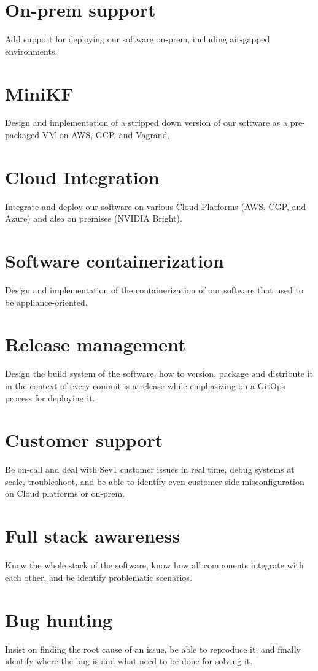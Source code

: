 \documentclass[margin,centered]{res}
\begin{document}
\begin{resume}
\section{\sc On-prem support}
Add support for deploying our software on-prem, including air-gapped
environments.

\section{\sc MiniKF}
Design and implementation of a stripped down version of our software as a
pre-packaged VM on AWS, GCP, and Vagrand.

\section{\sc Cloud Integration}
Integrate and deploy our software on various Cloud Platforms (AWS, CGP, and
Azure) and also on premises (NVIDIA Bright).

\section{\sc Software containerization}
Design and implementation of the containerization of our software that used
to be appliance-oriented.

\section{\sc Release management}
Design the build system of the software, how to version, package and distribute
it in the context of every commit is a release while emphasizing on a GitOps
process for deploying it.

\section{\sc Customer support}
Be on-call and deal with Sev1 customer issues in real time, debug systems at
scale, troubleshoot, and be able to identify even customer-side
misconfiguration on Cloud platforms or on-prem.

\section{\sc Full stack awareness}
Know the whole stack of the software, know how all components integrate with
each other, and be identify problematic scenarios.

\section{\sc Bug hunting}
Insist on finding the root cause of an issue, be able to reproduce it, and
finally identify where the bug is and what need to be done for solving it.



\end{resume}
\end{document}
